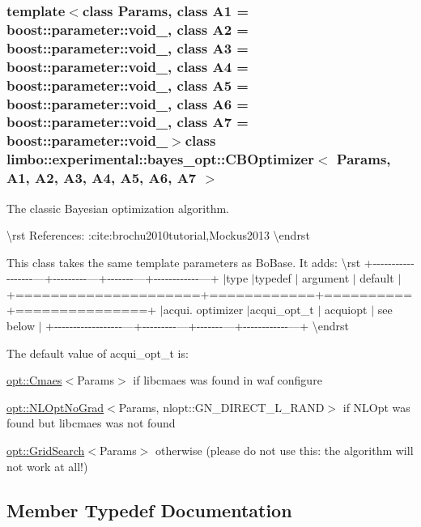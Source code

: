 \subsubsection*{template$<$class Params, class A1 = boost\+::parameter\+::void\+\_\+, class A2 = boost\+::parameter\+::void\+\_\+, class A3 = boost\+::parameter\+::void\+\_\+, class A4 = boost\+::parameter\+::void\+\_\+, class A5 = boost\+::parameter\+::void\+\_\+, class A6 = boost\+::parameter\+::void\+\_\+, class A7 = boost\+::parameter\+::void\+\_\+$>$class limbo\+::experimental\+::bayes\+\_\+opt\+::\+C\+B\+Optimizer$<$ Params, A1, A2, A3, A4, A5, A6, A7 $>$}

The classic Bayesian optimization algorithm.

\textbackslash{}rst References\+: \+:cite\+:{\ttfamily brochu2010tutorial,Mockus2013} \textbackslash{}endrst

This class takes the same template parameters as Bo\+Base. It adds\+: \textbackslash{}rst +-\/-\/-\/-\/-\/-\/-\/-\/-\/-\/-\/-\/-\/-\/-\/-\/-\/-\/---+-\/-\/-\/-\/-\/-\/-\/-\/-\/---+-\/-\/-\/-\/-\/-\/-\/---+-\/-\/-\/-\/-\/-\/-\/-\/-\/-\/-\/-\/---+ $\vert$type $\vert$typedef $\vert$ argument $\vert$ default $\vert$ +=====================+============+==========+===============+ $\vert$acqui. optimizer $\vert$acqui\+\_\+opt\+\_\+t $\vert$ acquiopt $\vert$ see below $\vert$ +-\/-\/-\/-\/-\/-\/-\/-\/-\/-\/-\/-\/-\/-\/-\/-\/-\/-\/---+-\/-\/-\/-\/-\/-\/-\/-\/-\/---+-\/-\/-\/-\/-\/-\/-\/---+-\/-\/-\/-\/-\/-\/-\/-\/-\/-\/-\/-\/---+ \textbackslash{}endrst

The default value of acqui\+\_\+opt\+\_\+t is\+:
\begin{DoxyItemize}
\item {\ttfamily \hyperlink{structlimbo_1_1opt_1_1_cmaes}{opt\+::\+Cmaes}$<$Params$>$} if libcmaes was found in {\ttfamily waf configure}
\item {\ttfamily \hyperlink{structlimbo_1_1opt_1_1_n_l_opt_no_grad}{opt\+::\+N\+L\+Opt\+No\+Grad}$<$Params, nlopt\+::\+G\+N\+\_\+\+D\+I\+R\+E\+C\+T\+\_\+\+L\+\_\+\+R\+A\+N\+D$>$} if N\+L\+Opt was found but libcmaes was not found
\item {\ttfamily \hyperlink{structlimbo_1_1opt_1_1_grid_search}{opt\+::\+Grid\+Search}$<$Params$>$} otherwise (please do not use this\+: the algorithm will not work at all!) 
\end{DoxyItemize}

\subsection{Member Typedef Documentation}
\hypertarget{classlimbo_1_1experimental_1_1bayes__opt_1_1_c_b_optimizer_afc949eca6b8ea7a84b5e0b38e8c17a4d}{}
